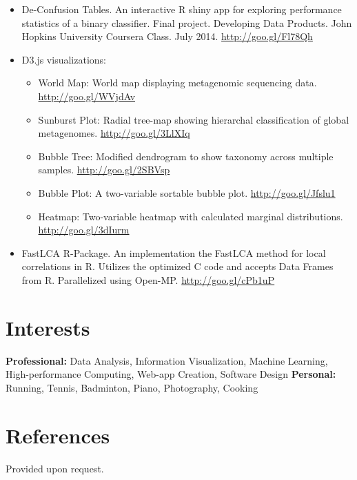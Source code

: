\documentclass[print]{hanson_cv} %
\begin{document}
\begin{itemize}
\item De-Confusion Tables. An interactive R shiny app for exploring performance statistics of a binary classifier. Final project. Developing Data Products. John Hopkins University Coursera Class. July 2014. \href{http://goo.gl/Fl78Qh}{http://goo.gl/Fl78Qh}
\item D3.js visualizations:
\begin{itemize}
	\item World Map: World map displaying metagenomic sequencing data. \href{http://goo.gl/WVjdAv}{http://goo.gl/WVjdAv}
	\item Sunburst Plot: Radial tree-map showing hierarchal classification of global metagenomes. \href{http://goo.gl/3LlXIq}{http://goo.gl/3LlXIq}
	\item Bubble Tree: Modified dendrogram to show taxonomy across multiple samples. \href{http://goo.gl/2SBVsp}{http://goo.gl/2SBVsp}
	\item Bubble Plot: A two-variable sortable bubble plot. \href{http://goo.gl/Jfslu1}{http://goo.gl/Jfslu1}
	\item Heatmap: Two-variable heatmap with calculated marginal distributions. \href{http://goo.gl/3dIurm}{http://goo.gl/3dIurm}
\end{itemize}
\item FastLCA R-Package. An implementation the FastLCA method for local correlations in R. Utilizes the optimized C code and accepts Data Frames from R. Parallelized using Open-MP. \href{http://goo.gl/cPb1uP}{http://goo.gl/cPb1uP}
\end{itemize}


\section{Interests}

\textbf{Professional:} Data Analysis, Information Visualization, Machine Learning, High-performance Computing, Web-app Creation, Software Design  \textbf{Personal:} Running, Tennis, Badminton, Piano, Photography, Cooking 

\section{References}

Provided upon request.
\end{document}
